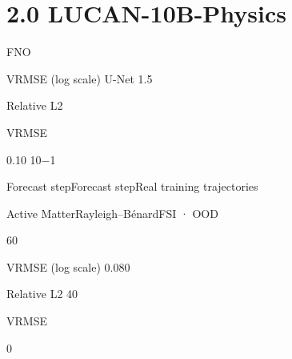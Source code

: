 \documentclass[11pt]{article}
\begin{document}
\section*{2.0                                                                                                                                                                                           LUCAN-10B-Physics}


\quad FNO\par





VRMSE (log scale)
U-Net
1.5



Relative L2

\par



\noindent VRMSE\par

0.10
10\ensuremath{-}1

\par




\par


\noindent Forecast step\quad Forecast step\quad Real training trajectories\par


\noindent Active Matter\quad Rayleigh–Bénard\quad FSI · OOD\par

60

\par





VRMSE (log scale)
0.080


Relative L2
40

VRMSE

\par



\par



\par


0
\end{document}
